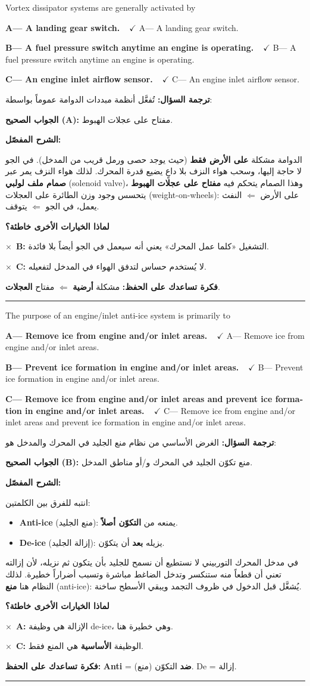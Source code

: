 \documentclass[11pt,a4paper]{article}
\newcommand{\en}[1]{\textenglish{#1}}
\newcommand{\correctletter}{}
\newcommand{\opt}[2]{%
  \ifdefstring{\correctletter}{#1}%
    {\textcolor{ansgreen}{\textbf{#1— #2\ \ $\checkmark$}}}%
    {#1— #2}\par}
\newcommand{\Q}[6]{%
  \renewcommand{\correctletter}{#6}%
  \par\bigskip
  \phantomsection\label{q#1}%
  \begin{tcolorbox}[enhanced,breakable,colback=qback,colframe=qframe,
      arc=2mm,boxrule=0.8pt,fonttitle=\bfseries,
      title={\en{Question #1}}]
    \begin{english}
      #2\par\smallskip
      \opt{A}{#3}\opt{B}{#4}\opt{C}{#5}
    \end{english}
  \end{tcolorbox}}
\newcommand{\tr}[1]{\textbf{\textcolor{qframe}{ترجمة السؤال:}} #1\par}
\newcommand{\ans}[2]{%
  \begin{tcolorbox}[colback=ansback,colframe=ansgreen,boxrule=0.6pt,arc=1.5mm,
      left=4pt,right=4pt,top=2pt,bottom=2pt]
    \textbf{\textcolor{ansgreen}{الجواب الصحيح (\en{#1}):}} #2
  \end{tcolorbox}}
\newcommand{\sharh}[1]{\textbf{\textcolor{conceptc}{الشرح المفصّل:}}\par #1\par}
\newcommand{\nohead}{\textbf{\textcolor{wrongc}{لماذا الخيارات الأخرى خاطئة؟}}\par}
\newcommand{\no}[2]{\hspace*{1em}\textcolor{wrongc}{$\times$}\ \textbf{\en{#1}:} #2\par}
\newcommand{\tip}[1]{%
  \begin{tcolorbox}[colback=tipback,colframe=tipframe,boxrule=0.5pt,arc=1.5mm,
      left=4pt,right=4pt,top=2pt,bottom=2pt]
    \textbf{فكرة تساعدك على الحفظ:} #1
  \end{tcolorbox}}
\newcommand{\qsep}{\par\medskip\noindent\textcolor{qframe!40}{\rule{\linewidth}{0.4pt}}\par}
\begin{document}
\Q{8799}{Vortex dissipator systems are generally activated by}
{A landing gear switch.}
{A fuel pressure switch anytime an engine is operating.}
{An engine inlet airflow sensor.}{A}
\tr{تُفعَّل أنظمة مبددات الدوامة عموماً بواسطة:}
\ans{A}{مفتاح على عجلات الهبوط.}
\sharh{الدوامة مشكلة \textbf{على الأرض فقط} (حيث يوجد حصى ورمل قريب من المدخل). في الجو لا حاجة إليها، وسحب هواء النزف بلا داعٍ يضيع قدرة المحرك. لذلك هواء النزف يمر عبر \textbf{صمام ملف لولبي} (\en{solenoid valve})، وهذا الصمام يتحكم فيه \textbf{مفتاح على عجلات الهبوط} يتحسس وجود وزن الطائرة على العجلات (\en{weight-on-wheels}): على الأرض $\Leftarrow$ النفث يعمل، في الجو $\Leftarrow$ يتوقف.}
\nohead
\no{B}{التشغيل «كلما عمل المحرك» يعني أنه سيعمل في الجو أيضاً بلا فائدة.}
\no{C}{لا يُستخدم حساس لتدفق الهواء في المدخل لتفعيله.}
\tip{مشكلة \textbf{أرضية} $\Leftarrow$ مفتاح \textbf{العجلات}.}
\qsep

\Q{8802}{The purpose of an engine/inlet anti-ice system is primarily to}
{Remove ice from engine and/or inlet areas.}
{Prevent ice formation in engine and/or inlet areas.}
{Remove ice from engine and/or inlet areas and prevent ice formation in engine and/or inlet areas.}{B}
\tr{الغرض الأساسي من نظام منع الجليد في المحرك والمدخل هو:}
\ans{B}{منع تكوّن الجليد في المحرك و/أو مناطق المدخل.}
\sharh{انتبه للفرق بين الكلمتين:
\begin{itemize}
  \item \textbf{\en{Anti-ice}} (منع الجليد): يمنعه من \textbf{التكوّن أصلاً}.
  \item \textbf{\en{De-ice}} (إزالة الجليد): يزيله \textbf{بعد} أن يتكوّن.
\end{itemize}
في مدخل المحرك التوربيني لا نستطيع أن نسمح للجليد بأن يتكون ثم نزيله، لأن إزالته تعني أن قطعاً منه ستنكسر وتدخل الضاغط مباشرة وتسبب أضراراً خطيرة. لذلك النظام هنا \textbf{منع} (\en{anti-ice}): يُشغَّل قبل الدخول في ظروف التجمد ويبقي الأسطح ساخنة.}
\nohead
\no{A}{الإزالة هي وظيفة \en{de-ice}، وهي خطيرة هنا.}
\no{C}{الوظيفة \textbf{الأساسية} هي المنع فقط.}
\tip{\en{\textbf{Anti}} = \textbf{ضد} التكوّن (منع). \en{De} = إزالة.}
\qsep
\end{document}
